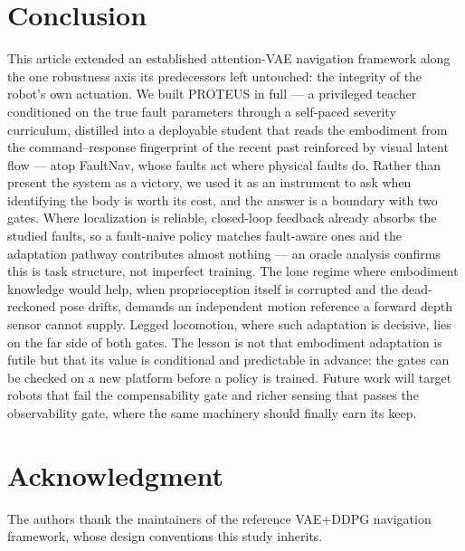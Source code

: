 \documentclass[journal]{IEEEtran}
\begin{document}
\section{Conclusion}\label{sec:conclusion}
This article extended an established attention-VAE navigation framework along
the one robustness axis its predecessors left untouched: the integrity of the
robot's own actuation. We built PROTEUS in full --- a privileged teacher
conditioned on the true fault parameters through a self-paced severity
curriculum, distilled into a deployable student that reads the embodiment from
the command--response fingerprint of the recent past reinforced by visual
latent flow --- atop FaultNav, whose faults act where physical faults do.
Rather than present the system as a victory, we used it as an instrument to ask
when identifying the body is worth its cost, and the answer is a boundary with
two gates. Where localization is reliable, closed-loop feedback already absorbs
the studied faults, so a fault-naive policy matches fault-aware ones and the
adaptation pathway contributes almost nothing --- an oracle analysis confirms
this is task structure, not imperfect training. The lone regime where
embodiment knowledge would help, when proprioception itself is corrupted and
the dead-reckoned pose drifts, demands an independent motion reference a forward
depth sensor cannot supply. Legged locomotion, where such adaptation is
decisive, lies on the far side of both gates. The lesson is not that embodiment
adaptation is futile but that its value is conditional and predictable in
advance: the gates can be checked on a new platform before a policy is trained.
Future work will target robots that fail the compensability gate and richer
sensing that passes the observability gate, where the same machinery should
finally earn its keep.

\section*{Acknowledgment}
The authors thank the maintainers of the reference VAE+DDPG navigation
framework, whose design conventions this study inherits.

\balance


\end{document}
